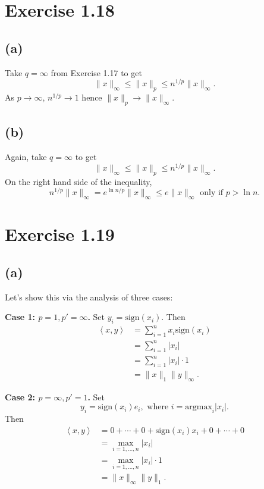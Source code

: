 \newpage
\section*{Exercise 1.18}
\subsection*{(a)}
Take $q = \infty$ from Exercise 1.17 to get 
\[ \lVert x \rVert_{\infty} \leq \lVert x \rVert_{p} \leq n^{1/p} \lVert x \rVert_{\infty}. \]
As $p \to \infty$, $n^{1/p} \to 1$ hence $\lVert x \rVert_{p} \to \lVert x \rVert_{\infty}$.

\subsection*{(b)}
Again, take $q = \infty$ to get 
\[ \lVert x \rVert_{\infty} \leq \lVert x \rVert_{p} \leq n^{1/p} \lVert x \rVert_{\infty}. \]
On the right hand side of the inequality, 
\[ n^{1/p} \lVert x \rVert_{\infty} = e^{\ln{n}/p} \lVert x \rVert_{\infty} \leq 
e \lVert x \rVert_{\infty} \text { only if } p > \ln{n}. \]


\newpage
\section*{Exercise 1.19}
\subsection*{(a)}
Let's show this via the analysis of three cases:

\textbf{Case 1: $p = 1, p' = \infty$.} Set $y_i = \mathrm{sign}(x_i)$. Then 
\begin{align*}
	\left\langle x, y \right\rangle 
	&= \sum_{i = 1}^{n} x_i \mathrm{sign}(x_i) \\
	&= \sum_{i = 1}^{n} |x_i| \\
	&= \sum_{i = 1}^{n} |x_i| \cdot 1 \\
	&= \lVert x \rVert_{1} \lVert y \rVert_{\infty}.
\end{align*}

\textbf{Case 2: $p = \infty, p' = 1$.} Set 
\[ y_i = \mathrm{sign}(x_i)e_i, \text{ where } i = \mathrm{argmax}_{i}|x_i|. \]
Then 
\begin{align*}
	\left\langle x, y \right\rangle 
	&= 0 + \cdots + 0 + \mathrm{sign}(x_i)x_i + 0 + \cdots + 0 \\
	&= \max_{i = 1, \dots, n} |x_i| \\
	&= \max_{i = 1, \dots, n} |x_i| \cdot 1 \\
	&= \lVert x \rVert_{\infty}\lVert y \rVert_{1}.
\end{align*}

